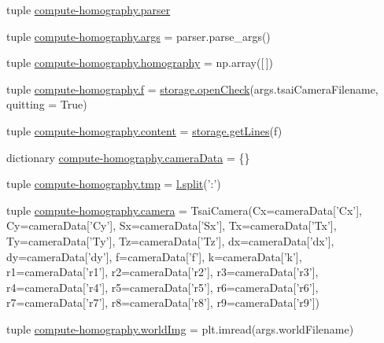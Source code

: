 \begin{DoxyCompactItemize}
\item 
tuple \hyperlink{namespacecompute-homography_a624c695f9972c02993d1c370c28867f8}{compute-\/homography.\-parser}
\item 
tuple \hyperlink{namespacecompute-homography_aab37023421b1c3ecc8a7648f41778972}{compute-\/homography.\-args} = parser.\-parse\-\_\-args()
\item 
tuple \hyperlink{namespacecompute-homography_a0feea80379e0368958412d7e9b529bd9}{compute-\/homography.\-homography} = np.\-array(\mbox{[}$\,$\mbox{]})
\item 
tuple \hyperlink{namespacecompute-homography_ad6d246e2e66e397bccbe023b703d1c76}{compute-\/homography.\-f} = \hyperlink{namespacestorage_ad83a9b3ef476a0684e7cc4875a77f040}{storage.\-open\-Check}(args.\-tsai\-Camera\-Filename, quitting = True)
\item 
tuple \hyperlink{namespacecompute-homography_a19f8208eea1885f83547ab59dfb6b1c1}{compute-\/homography.\-content} = \hyperlink{namespacestorage_ae247cceb087024add485a77083a1a56e}{storage.\-get\-Lines}(f)
\item 
dictionary \hyperlink{namespacecompute-homography_a2be768add5fef829cc17c08693bba49b}{compute-\/homography.\-camera\-Data} = \{\}
\item 
tuple \hyperlink{namespacecompute-homography_af392738f6b769ed0f693dffef4f8bc65}{compute-\/homography.\-tmp} = \hyperlink{utils_8hpp_a59bef446cafa212bf03dca6fb59c207d}{l.\-split}('\-:')
\item 
tuple \hyperlink{namespacecompute-homography_ad2a5f410a3c22a6e1d49deb87f0d1886}{compute-\/homography.\-camera} = Tsai\-Camera(Cx=camera\-Data\mbox{[}'Cx'\mbox{]}, Cy=camera\-Data\mbox{[}'Cy'\mbox{]}, Sx=camera\-Data\mbox{[}'Sx'\mbox{]}, Tx=camera\-Data\mbox{[}'Tx'\mbox{]}, Ty=camera\-Data\mbox{[}'Ty'\mbox{]}, Tz=camera\-Data\mbox{[}'Tz'\mbox{]}, dx=camera\-Data\mbox{[}'dx'\mbox{]}, dy=camera\-Data\mbox{[}'dy'\mbox{]}, f=camera\-Data\mbox{[}'f'\mbox{]}, k=camera\-Data\mbox{[}'k'\mbox{]}, r1=camera\-Data\mbox{[}'r1'\mbox{]}, r2=camera\-Data\mbox{[}'r2'\mbox{]}, r3=camera\-Data\mbox{[}'r3'\mbox{]}, r4=camera\-Data\mbox{[}'r4'\mbox{]}, r5=camera\-Data\mbox{[}'r5'\mbox{]}, r6=camera\-Data\mbox{[}'r6'\mbox{]}, r7=camera\-Data\mbox{[}'r7'\mbox{]}, r8=camera\-Data\mbox{[}'r8'\mbox{]}, r9=camera\-Data\mbox{[}'r9'\mbox{]})
\item 
tuple \hyperlink{namespacecompute-homography_a3c432a89273d572ae71374936788e424}{compute-\/homography.\-world\-Img} = plt.\-imread(args.\-world\-Filename)

\end{DoxyCompactItemize}
